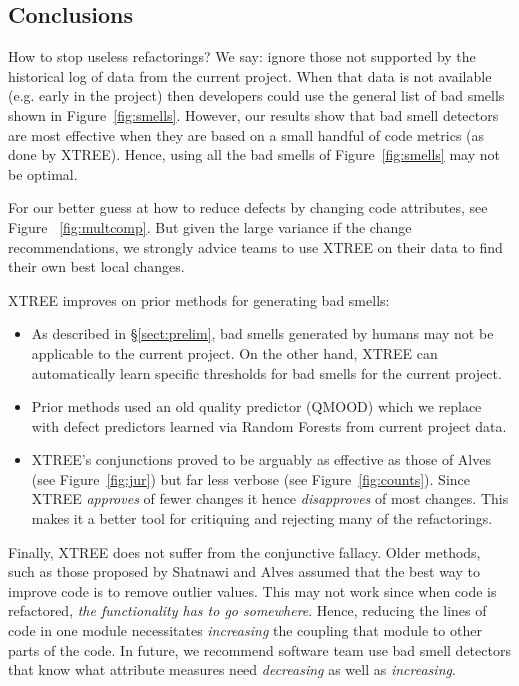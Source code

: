 \documentclass[twocolumn,5p]{elsarticle}
\newcommand{\tion}[1]{\S\ref{sect:#1}}
\newcommand{\fig}[1]{Figure~\ref{fig:#1}}
\theoremstyle{break}
\begin{document}
\begin{itemize}
% 


\section{Conclusions}
How to stop useless refactorings?
We say: ignore those not supported by the historical log of data from
the current project.  
When that data is not available (e.g. early
in the project) then developers could use the general list of
bad smells shown in \fig{smells}. However, 
our results
show that  bad smell detectors are most
effective when they are based
on a small handful of code metrics (as done by XTREE).
Hence, using all the bad smells of \fig{smells} may not be optimal. 

For our better guess at how to reduce defects by changing code attributes,
  see  Figure ~\ref{fig:multcomp}. But given the large variance if the change recommendations, we strongly advice teams to use
  XTREE on their data to find their own best local changes.

XTREE improves on prior methods for generating bad smells:
\begin{itemize}
    \item As described in \tion{prelim}, bad smells generated by humans may not be applicable to the current project. On the other hand, XTREE can automatically learn specific thresholds
    for bad smells for the current project.
    \item Prior methods used an old quality predictor (QMOOD) which we replace with defect predictors learned via Random Forests
    from   current project data.
      
    
    \item XTREE's conjunctions proved to be arguably as effective
    as those of Alves (see \fig{jur}) but far less verbose (see \fig{counts}). Since XTREE {\em approves} of fewer changes
    it hence {\em disapproves} of most changes. This makes it a better tool for critiquing and rejecting
    many of the refactorings.
\end{itemize}
Finally, XTREE does not suffer from the conjunctive fallacy.
    Older methods, such as those proposed by  Shatnawi and Alves assumed
    that the best way to improve code is to remove outlier  values. This may not work since when code is refactored,
    {\em the functionality has to go somewhere}. Hence,  reducing the lines of code in one module necessitates   
    {\em increasing} the coupling that module
    to other parts of the code. In future, we recommend software team use bad smell detectors that know what attribute measures
    need {\em decreasing} as well as {\em increasing}.
    

\end{itemize}
\end{document}
